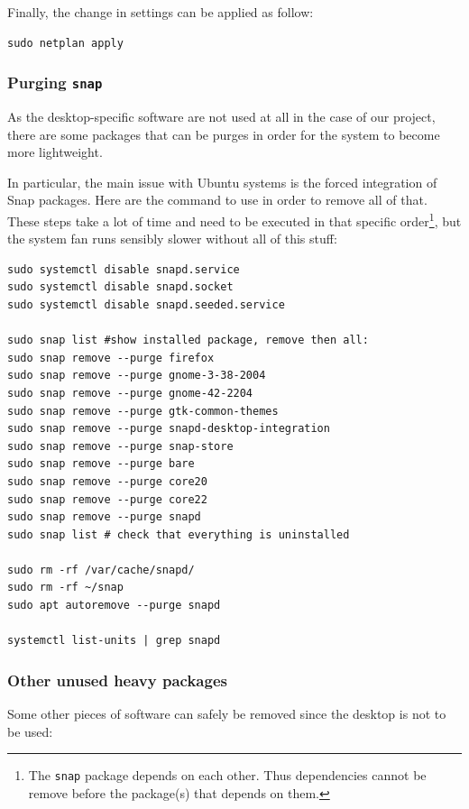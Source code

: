 \documentclass[10pt]{article}
\begin{document}
Finally, the change in settings can be applied
as follow:

\begin{verbatim}
sudo netplan apply
\end{verbatim}

\subsubsection{Purging \texttt{snap}}
\label{sec:org6c12d91}
As the desktop-specific software are not used at all in the case
of our project, there are some packages that can be purges in order for the
system to become more lightweight.

In particular, the main issue with Ubuntu systems is the forced integration of
Snap packages. Here are the command to use in order to remove all of that.
These steps take a lot of time and need to be executed in that specific order\footnote{The \texttt{snap} package depends on each other. Thus dependencies
cannot be remove before the package(s) that depends on them.},
but the system fan runs sensibly slower without all of this stuff:

\begin{verbatim}
sudo systemctl disable snapd.service
sudo systemctl disable snapd.socket
sudo systemctl disable snapd.seeded.service

sudo snap list #show installed package, remove then all:
sudo snap remove --purge firefox
sudo snap remove --purge gnome-3-38-2004
sudo snap remove --purge gnome-42-2204
sudo snap remove --purge gtk-common-themes
sudo snap remove --purge snapd-desktop-integration
sudo snap remove --purge snap-store
sudo snap remove --purge bare
sudo snap remove --purge core20
sudo snap remove --purge core22
sudo snap remove --purge snapd
sudo snap list # check that everything is uninstalled

sudo rm -rf /var/cache/snapd/
sudo rm -rf ~/snap
sudo apt autoremove --purge snapd

systemctl list-units | grep snapd
\end{verbatim}

\subsubsection{Other unused heavy packages}
\label{sec:orgfe490ba}
Some other pieces of software can safely be removed since the desktop is
not to be used:
\end{document}

